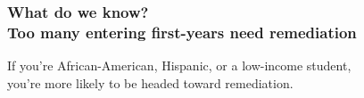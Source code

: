 \documentclass[13pt]{beamer}
\newcounter{a}
\newcounter{b}
\def\shadowradius{-10pt}
\newcommand\drawshadowbis[1]{
  \begin{pgfonlayer}{shadow}
    \fill[fill=white,path fading=fade up] ($(#1.south west)+((0,\shadowradius)$) rectangle ($(#1.south east)$);

    \fill[fill=white,path fading=fade right] ($(#1.south east)$) rectangle ($(#1.north east)+((\shadowradius,0)$);

    \fill[fill=white,path fading=fade down] ($(#1.north west)$) rectangle ($(#1.north east)+((0,-\shadowradius)$);

    \fill[fill=white,path fading=fade left] ($(#1.south west)$) rectangle ($(#1.north west)+(-\shadowradius,0)$);
  \end{pgfonlayer}
}
\begin{document}
\begin{frame}
  \frametitle{What do we know? \\ Too many entering first-years need remediation}


  If you're African-American, Hispanic, or a low-income student, \\
  \quad you're more likely to be headed toward remediation.
\end{frame}
\end{document}
